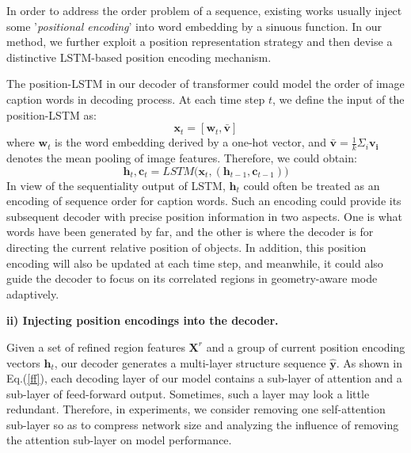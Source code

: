 \documentclass[review]{elsarticle}
\begin{document}
In order to address the order problem of a sequence, existing works usually inject some '\emph{positional encoding}' into word embedding by a sinuous function. In our method, we further exploit a position representation strategy and then devise a distinctive LSTM-based position encoding mechanism.

The position-LSTM in our decoder of transformer could model the order of image caption words in decoding process. At each time step \(t\), we define the input of the position-LSTM as:
\begin{equation}
  \bm{x}_{t} = [\bm{w}_t, \bm{\bar{v}}]
\end{equation}
where \(\bm{w}_t\) is the word embedding derived by a one-hot vector, and \(\bm{\bar{v}} = \frac{1}{k}\Sigma_i\bm{v_i}\) denotes the mean pooling of image features. Therefore, we could obtain:
\begin{equation}
  \bm{h}_t, \bm{c}_t = LSTM\big(\bm{x}_t,  (\bm{h}_{t-1}, \bm{c}_{t-1})\big)
\end{equation}
In view of the sequentiality output of LSTM, \(\bm{h}_t\) could often be treated as an encoding of sequence order for caption words. Such an encoding could provide its subsequent decoder with precise position information in two aspects. One is what words have been generated by far, and the other is where the decoder is for directing the current relative position of objects. In addition, this position encoding will also be updated at each time step, and meanwhile, it could also guide the decoder to focus on its correlated regions in geometry-aware mode adaptively.


\textbf{ii) Injecting position encodings into the decoder.}

Given a set of refined region features \(\bm{X}^r\) and a group of current position encoding vectors \(\bm{h}_t\), our decoder generates a multi-layer structure sequence \(\bm{\hat{y}}\). As shown in Eq.(\ref{ff}), each decoding layer of our model contains a sub-layer of attention and a sub-layer of feed-forward output. Sometimes, such a layer may look a little redundant. Therefore, in experiments, we consider removing one self-attention sub-layer so as to compress network size and analyzing the influence of removing the attention sub-layer on model performance.
\end{document}
